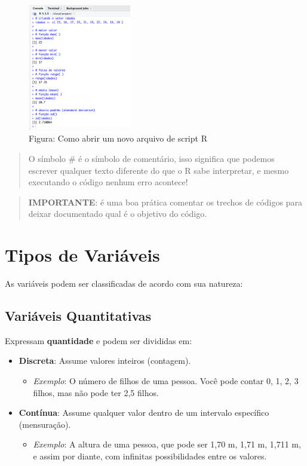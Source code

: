 \documentclass[
]{book}
\providecommand{\tightlist}{%
  \setlength{\itemsep}{0pt}\setlength{\parskip}{0pt}}
\begin{document}
\begin{figure}
\centering
\includegraphics[width=0.4\textwidth,height=\textheight]{telaRespostaConsole.png}
\caption{Figura: Como abrir um novo arquivo de script R}
\end{figure}

\begin{quote}
O símbolo \# é o símbolo de comentário, isso significa que podemos escrever qualquer texto diferente do que o R sabe interpretar, e mesmo executando o código nenhum erro acontece!
\end{quote}

\begin{quote}
\textbf{IMPORTANTE}: é uma boa prática comentar os trechos de códigos para deixar documentado qual é o objetivo do código.
\end{quote}

\chapter{Tipos de Variáveis}\label{tipos-de-variuxe1veis}

As variáveis podem ser classificadas de acordo com sua natureza:

\section{Variáveis Quantitativas}\label{variuxe1veis-quantitativas}

Expressam \textbf{quantidade} e podem ser divididas em:

\begin{itemize}
\tightlist
\item
  \textbf{Discreta}: Assume valores inteiros (contagem).

  \begin{itemize}
  \tightlist
  \item
    \emph{Exemplo}: O número de filhos de uma pessoa. Você pode contar 0, 1, 2, 3 filhos, mas não pode ter 2,5 filhos.
  \end{itemize}
\item
  \textbf{Contínua}: Assume qualquer valor dentro de um intervalo específico (mensuração).

  \begin{itemize}
  \tightlist
  \item
    \emph{Exemplo}: A altura de uma pessoa, que pode ser 1,70 m, 1,71 m, 1,711 m, e assim por diante, com infinitas possibilidades entre os valores.
  \end{itemize}
\end{itemize}
\end{document}
